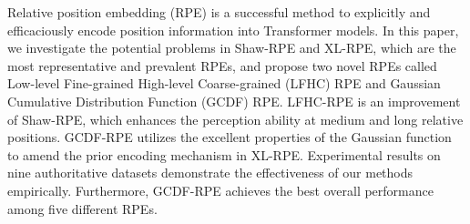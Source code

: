 Relative position embedding (RPE) is a successful method to explicitly and efficaciously encode position information into Transformer models. In this paper, we investigate the potential problems in Shaw-RPE and XL-RPE, which are the most representative and prevalent RPEs, and propose two novel RPEs called Low-level Fine-grained High-level Coarse-grained (LFHC) RPE and Gaussian Cumulative Distribution Function (GCDF) RPE. LFHC-RPE is an improvement of Shaw-RPE, which enhances the perception ability at medium and long relative positions. GCDF-RPE utilizes the excellent properties of the Gaussian function to amend the prior encoding mechanism in XL-RPE. Experimental results on nine authoritative datasets demonstrate the effectiveness of our methods empirically. Furthermore, GCDF-RPE achieves the best overall performance among five different RPEs.
